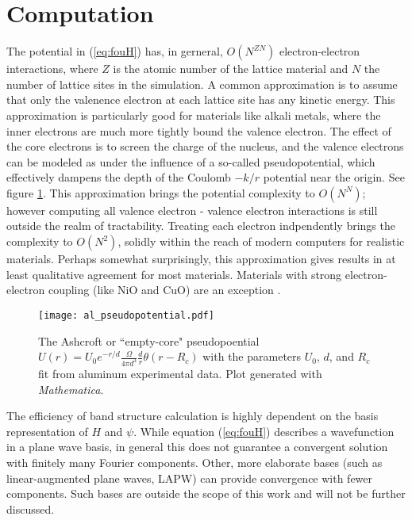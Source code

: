 \documentclass[12pt]{article}
\begin{document}
\section{Computation}
\par The potential in (\ref{eq:fouH}) has, in gerneral, $O(N^{Z N})$ electron-electron interactions, where $Z$ is the atomic number of the lattice material and $N$ the number of lattice sites in the simulation. A common approximation is to assume that only the valenence electron at each lattice site has any kinetic energy. This approximation is particularly good for materials like alkali metals, where the inner electrons are much more tightly bound the valence electron. The effect of the core electrons is to screen the charge of the nucleus, and the valence electrons can be modeled as under the influence of a so-called pseudopotential, which effectively dampens the depth of the Coulomb $-k/r$ potential near the origin. See figure \ref{fig:pseudopotential}. This approximation brings the potential complexity to $O(N^N)$; however computing all valence electron - valence electron interactions is still outside the realm of tractability. Treating each electron indpendently brings the complexity to $O(N^2)$, solidly within the reach of modern computers for realistic materials. Perhaps somewhat surprisingly, this approximation gives results in at least qualitative agreement for most materials. Materials with strong electron-electron coupling (like NiO and CuO) are an exception \cite{text}.
\begin{figure}[!hbt]
\centering
\texttt{[image: al\_pseudopotential.pdf]}
\caption{The Ashcroft or ``empty-core" pseudopoential $U(r) = U_0 e^{-r/d} \frac{\Omega}{4 \pi d^3} \frac{d}{r} \theta(r-R_c)$ with the parameters $U_0$, $d$, and $R_c$ fit from aluminum experimental data. Plot generated with \emph{Mathematica}.}
\label{fig:pseudopotential}
\end{figure}
\par The efficiency of band structure calculation is highly dependent on the basis representation of $H$ and $\psi$. While equation (\ref{eq:fouH}) describes a wavefunction in a plane wave basis, in general this does not guarantee a convergent solution with finitely many Fourier components. Other, more elaborate bases (such as linear-augmented plane waves, LAPW) can provide convergence with fewer components. Such bases are outside the scope of this work and will not be further discussed.
\end{document}
